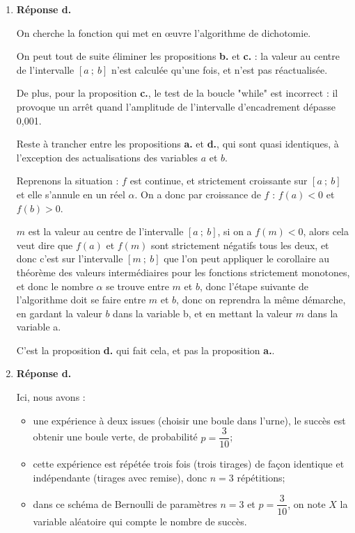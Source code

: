 \documentclass[10pt]{article}
\begin{document}
\begin{enumerate}
Finalement, on a : $ x\leqslant 0 \implies H(x) \geqslant 0$ : $H$ est bien à valeurs positives sur $ ]-\infty~;~0[$.

	\item \textbf{Réponse d.}

On cherche la fonction qui met en \oe{}uvre l'algorithme de dichotomie.

On peut tout de suite éliminer les propositions \textbf{b.} et \textbf{c.} : la valeur au centre de l'intervalle $ [a~;~b] $ n'est calculée qu'une fois, et n'est pas réactualisée.

De plus, pour la proposition \textbf{c.}, le test de la boucle "while" est incorrect : il provoque un arrêt quand l'amplitude de l'intervalle d'encadrement dépasse 0,001.

Reste à trancher entre les propositions \textbf{a.} et \textbf{d.}, qui sont quasi identiques, à l'exception des actualisations des variables $a$ et $b$.

Reprenons la situation : $f$ est continue, et strictement croissante sur $ [a~;~b] $ et elle s'annule en un réel $\alpha$. On a donc par croissance de $f$ : $f(a) < 0$ et $f(b) > 0$.

$m$ est la valeur au centre de l'intervalle $ [a~;~b] $, si on a $f(m) <0$, alors cela veut dire que $f(a)$ et $f(m)$ sont strictement négatifs tous les deux, et donc c'est sur l'intervalle $ [m~;~b] $ que l'on peut appliquer le corollaire au théorème des valeurs intermédiaires pour les fonctions strictement monotones, et donc le nombre $\alpha$ se trouve entre $m$ et $b$, donc l'étape suivante de l'algorithme doit se faire entre $m$ et $b$, donc on reprendra la même démarche, en gardant la valeur $b$ dans la variable b, et en mettant la valeur $m$ dans la variable a.

C'est la proposition \textbf{d.} qui fait cela, et pas la proposition \textbf{a.}.

	\item \textbf{Réponse d.}

Ici, nous avons :
\begin{itemize}
\item une expérience à deux issues (choisir une boule dans l'urne), le succès est \og obtenir une boule verte\fg{}, de probabilité $p = \dfrac{3}{10}$;
\item cette expérience est répétée trois fois (trois tirages) de façon identique et indépendante (tirages avec remise), donc $n=3$ répétitions;
\item dans ce schéma de Bernoulli de paramètres $n=3$ et $p=\dfrac{3}{10}$, on note $X$ la variable aléatoire qui compte le nombre de succès.
\end{itemize}


\end{enumerate}
\end{document}
